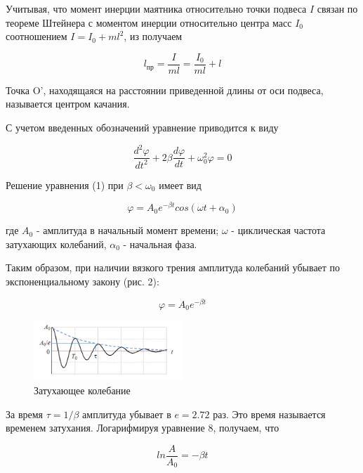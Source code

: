 \documentclass[a4paper]{article}
\begin{document}
Учитывая, что момент инерции маятника относительно точки подвеса $I$ связан по теореме Штейнера с моментом инерции относительно центра масс $I_0$ соотношением $I = I_0 + ml^2$, из  получаем

\begin{equation}
    l_{\text{пр}} = \frac{I}{ml} = \frac{I_0}{ml} + l
\end{equation}

Точка O', находящаяся на расстоянии приведенной длины от оси подвеса, называется центром качания.

С учетом введенных обозначений уравнение  приводится к виду

\begin{equation}
\frac{d^2 \varphi}{dt^2} + 2\beta \frac{d \varphi}{dt} + \omega_0^2 \varphi = 0
\end{equation}

Решение уравнения (1) при $\beta < \omega_0$ имеет вид

\begin{equation}
\varphi = A_0 e^{-\beta t} cos(\omega t + \alpha_0)
\end{equation}

где $A_0$ - амплитуда в начальный момент времени; $\omega$ - циклическая частота затухающих колебаний, $\alpha_0$ - начальная фаза.

Таким образом, при наличии вязкого трения амплитуда колебаний убывает по экспоненциальному закону (рис. 2):

\begin{equation}
\varphi = A_0 e^{-\beta t}
\end{equation}

\begin{figure}[h]
\centering
\includegraphics[width=0.5\textwidth]{2.png}
\caption{Затухающее колебание}
\end{figure}

За время $\tau = 1/\beta$ амплитуда убывает в $e = 2.72$ раз. Это время называется временем затухания. Логарифмируя уравнение 8, получаем, что

\begin{equation}
ln\frac{A}{A_0} = -\beta t
\end{equation}
\end{document}

